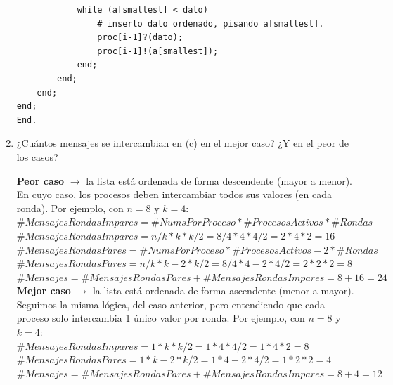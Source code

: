 \documentclass[a4paper, 10pt]{article}
\newenvironment{QandA}{
    \begin{enumerate}\bfseries}
    {\end{enumerate}
}
\newenvironment{answered}{\par\normalfont}{}
\begin{document}
\begin{QandA}
\begin{enumerate}[labelindent=0pt, align=left, leftmargin=0pt]
\begin{answered}
\begin{lstlisting}
            while (a[smallest] < dato)
                # inserto dato ordenado, pisando a[smallest].
                proc[i-1]?(dato);
                proc[i-1]!(a[smallest]);
            end;
        end;
    end;
end;
End.
\end{lstlisting}
\end{answered}
\item ¿Cuántos mensajes se intercambian en (c) en el mejor caso? ¿Y en el peor de los casos?
\begin{answered}
    \textbf{Peor caso} $\rightarrow$ la lista está ordenada de forma descendente (mayor a menor). En cuyo caso, los procesos deben intercambiar todos sus valores (en cada ronda). Por ejemplo, con $n=8$ y $k=4$:
    \\
    $\#MensajesRondasImpares = \#NumsPorProceso * \#ProcesosActivos * \#Rondas$
    \\
    $\#MensajesRondasImpares = n/k * k * k/2 = 8/4 * 4 * 4/2 = 2 * 4 * 2 = 16$ 
    \\
    $\#MensajesRondasPares = \#NumsPorProceso * \#ProcesosActivos - 2 * \#Rondas$
    \\
    $\#MensajesRondasPares = n/k * k-2 * k/2 = 8/4 * 4-2 * 4/2 = 2 * 2 * 2 = 8$ 
    \\
    $\#Mensajes = \#MensajesRondasPares + \#MensajesRondasImpares = 8 + 16 = 24$
    \\
    \textbf{Mejor caso} $\rightarrow$ la lista está ordenada de forma ascendente (menor a mayor). Seguimos la misma lógica, del caso anterior, pero entendiendo que cada proceso solo intercambia 1 único valor por ronda. Por ejemplo, con $n=8$ y $k=4$:
    \\
    $\#MensajesRondasImpares = 1 * k * k/2 = 1 * 4 * 4/2 = 1 * 4 * 2 = 8$
    \\
    $\#MensajesRondasPares = 1 * k-2 * k/2 = 1 * 4-2 * 4/2 = 1 * 2 * 2 = 4$
    \\
    $\#Mensajes = \#MensajesRondasPares + \#MensajesRondasImpares = 8 + 4 = 12$
\end{answered}


\end{enumerate}
\end{QandA}
\end{document}
